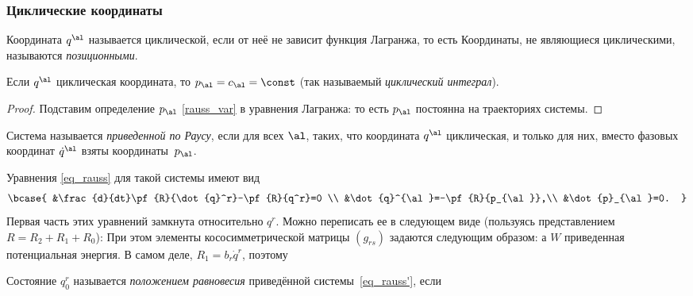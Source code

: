\documentclass[a4paper,12pt]{article}
\newcommand{\tdf}[1]{\textsl{#1}}
\newcommand{\eql}[2]{\begin{equation}\label{#2}#1\end{equation}}
\begin{document}
\subsubsection{Циклические координаты}

\begin{df}
Координата $q^{\al}$ называется циклической, если от неё не зависит
функция Лагранжа, то есть
Координаты, не являющиеся циклическими, называются \tdf{позиционными}.
\end{df}
\begin{stm}
\label{cycle_coord}
Если $q^{\al}$ циклическая координата, то
$p_{\al}=c_{\al}=\const$ (так называемый \tdf{циклический интеграл}).
\end{stm}
\begin{proof}
Подставим определение $p_{\al}$ \eqref{rauss_var} в уравнения Лагранжа:
то есть $p_\al$ постоянна на траекториях системы.
\end{proof}
\begin{df}
Система называется \tdf{приведенной по Раусу}, если для всех $\al$,
таких, что координата $q^{\al}$ циклическая, и только для них,
вместо фазовых координат $\dot{q}^{\al}$ взяты координаты~$p_{\al}$.
\end{df}
Уравнения \eqref{eq_rauss} для такой системы имеют вид
\eql{\bcase{
&\frac{d}{dt}\pf{R}{\dot{q}^r}-\pf{R}{q^r}=0 \\
&\dot{q}^{\al}=-\pf{R}{p_{\al}},\\
&\dot{p}_{\al}=0.
}
}{eq_rauss'} Первая часть этих уравнений замкнута относительно
$q^r$. Можно переписать ее в следующем виде (пользуясь
представлением $R=R_2+R_1+R_0$):
При этом элементы кососимметрической матрицы $(g_{rs})$ задаются
следующим образом:  а $W$
приведенная потенциальная энергия.
В самом деле, $R_1 = b_r \dot q^r$,
поэтому

\begin{df}
Состояние $q_0^r$ называется \tdf{положением равновесия} приведённой системы~\eqref{eq_rauss'}, если
\end{df}
\end{document}
